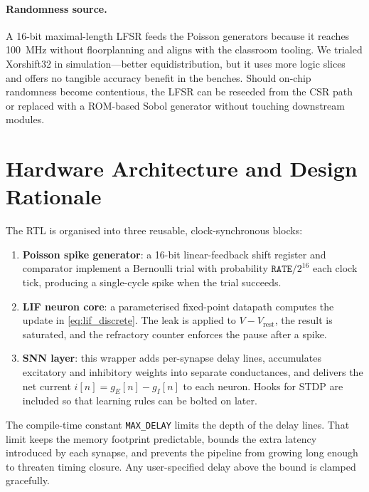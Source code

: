 \documentclass[10pt,onecolumn]{IEEEtran}
\newcommand{\Vrest}{V_{\mathrm{rest}}}
\begin{document}
\paragraph{Randomness source.} A 16-bit maximal-length LFSR feeds the Poisson generators because it reaches 100~MHz without floorplanning and aligns with the classroom tooling. We trialed Xorshift32 in simulation—better equidistribution, but it uses more logic slices and offers no tangible accuracy benefit in the benches. Should on-chip randomness become contentious, the LFSR can be reseeded from the CSR path or replaced with a ROM-based Sobol generator without touching downstream modules.


\section{Hardware Architecture and Design Rationale}
\label{sec:arch}

The RTL is organised into three reusable, clock-synchronous blocks:

\begin{enumerate}
  \item \textbf{Poisson spike generator}: a 16-bit linear-feedback shift register and comparator implement a Bernoulli trial with probability \(\texttt{RATE}/2^{16}\) each clock tick, producing a single-cycle spike when the trial succeeds.\vspace{2pt}
  \item \textbf{LIF neuron core}: a parameterised fixed-point datapath computes the update in \eqref{eq:lif_discrete}. The leak is applied to \(V-\Vrest\), the result is saturated, and the refractory counter enforces the pause after a spike.\vspace{2pt}
  \item \textbf{SNN layer}: this wrapper adds per-synapse delay lines, accumulates excitatory and inhibitory weights into separate conductances, and delivers the net current \(i[n]=g_E[n]-g_I[n]\) to each neuron. Hooks for STDP are included so that learning rules can be bolted on later.
\end{enumerate}

\noindent
The compile-time constant \texttt{MAX\_DELAY} limits the depth of the delay lines. That limit keeps the memory footprint predictable, bounds the extra latency introduced by each synapse, and prevents the pipeline from growing long enough to threaten timing closure. Any user-specified delay above the bound is clamped gracefully.
\end{document}
